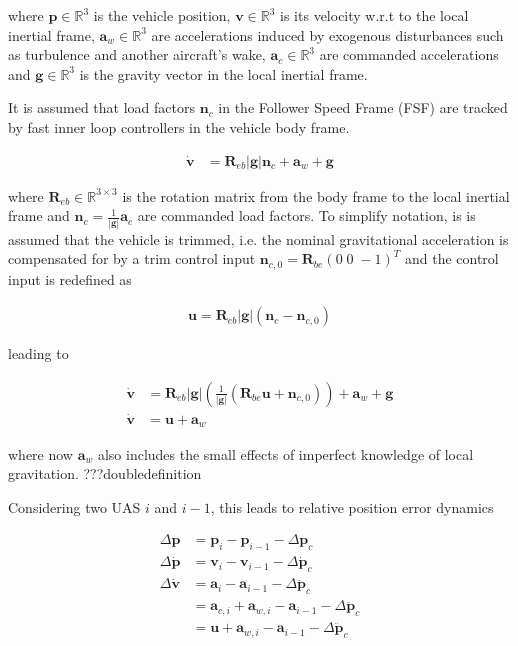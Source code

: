 \documentclass{ifacconf}
\providecommand{\mbf}[1]{\mathbf{#1}}
\begin{document}
where $\mbf{p} \in \mathbb{R}^3$ is the vehicle position, $\mbf{v} \in \mathbb{R}^3$ is its velocity w.r.t to the local inertial frame, $\mbf{a}_w \in \mathbb{R}^3$ are accelerations induced by exogenous disturbances such as turbulence and another aircraft's wake, $\mbf{a}_{c} \in \mathbb{R}^3$ are commanded accelerations and $\mbf{g} \in \mathbb{R}^3$ is the gravity vector in the local inertial frame.

It is assumed that load factors $\mbf{n}_c$ in the Follower Speed Frame (FSF) are tracked by fast inner loop controllers in the vehicle body frame.

\begin{align}
\dot{\mbf{v}} &= \mbf{R}_{eb} |\mbf{g}|\mbf{n}_c + \mbf{a}_w + \mbf{g}
\label{eq:svmloadfactorlevel}
\end{align}

where $\mbf{R}_{eb} \in \mathbb{R}^{3 \times 3}$ is the rotation matrix from the body frame to the local inertial frame and $\mbf{n}_c = \frac{1}{|\mbf{g}|} \mbf{a}_c$ are commanded load factors. To simplify notation, is is assumed that the vehicle is trimmed, i.e. the nominal gravitational acceleration is compensated for by a trim control input $\mbf{n}_{c,0} = \mbf{R}_{be}(0 \; 0 \; -1)^{T}$ and the control input is redefined as

	\begin{align}
\mbf{u} = \mbf{R}_{eb} |\mbf{g}|(\mbf{n}_c - \mbf{n}_{c,0})	
\label{eq:defushort}
\end{align}

leading to

\begin{align}
\dot{\mbf{v}} &= \mbf{R}_{eb}|\mbf{g}|
(
\frac{1}{|\mbf{g}|}
(\mbf{R}_{be} \mbf{u} + \mbf{n}_{c,0})
) + \mbf{a}_w + \mbf{g}\\
\dot{\mbf{v}} &= \mbf{u} + \mbf{a}_w
\label{eq:svmshort}
\end{align}

where now $\mbf{a}_w$ also includes the small effects of imperfect knowledge of local gravitation. ???doubledefinition

Considering two UAS $i$ and $i-1$, this leads to relative position error dynamics

\begin{align}
\Delta \mbf{p} &= \mbf{p}_i - \mbf{p}_{i-1} - \Delta \mbf{p}_c \\
\Delta \dot{\mbf{p}} &= \mbf{v}_{i} - \mbf{v}_{i-1} -  \Delta \dot{\mbf{p}}_c\\
\Delta \dot{\mbf{v}} &= \mbf{a}_{i} - \mbf{a}_{i-1} -  \Delta \ddot{\mbf{p}}_c\\
{} &= \mbf{a}_{c,i} + \mbf{a}_{w,i}
 - \mbf{a}_{i-1} -  \Delta \ddot{\mbf{p}}_c\\
{} &= \mbf{u} + \mbf{a}_{w,i}
 - \mbf{a}_{i-1} -  \Delta \ddot{\mbf{p}}_c
\end{align}
\end{document}
